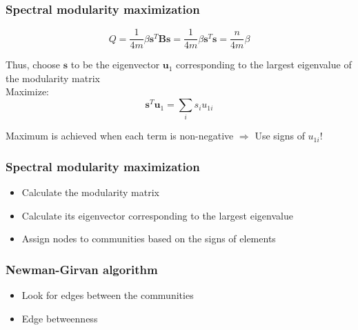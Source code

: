 \documentclass{beamer}
\begin{document}
\begin{frame}
    \frametitle{Spectral modularity maximization}
    \centering
$$Q = \frac{1}{4m}\beta{\mathbf s}^T{\mathbf B}{\mathbf s} = \frac{1}{4m}\beta {\mathbf s}^T{\mathbf s} = \frac{n}{4m}\beta$$

Thus, choose ${\mathbf s}$ to be the eigenvector ${\mathbf u_1}$ corresponding to the largest eigenvalue of the modularity matrix\\

Maximize:
$${\mathbf s}^T{\mathbf u}_1 = \sum\limits_is_iu_{1i}$$

Maximum is achieved when each term is non-negative $\Rightarrow$ Use signs of $u_{1i}$!

\end{frame}
\begin{frame}
    \frametitle{Spectral modularity maximization}
    \centering
    \begin{itemize}
    \setlength\itemsep{1em}
        \item{Calculate the modularity matrix}
        \item{Calculate its eigenvector corresponding to the largest eigenvalue}
        \item{Assign nodes to communities based on the signs of elements}
    \end{itemize}
\end{frame}
\begin{frame}
    \frametitle{Newman-Girvan algorithm}
    \centering
    
    \begin{itemize}
        \setlength\itemsep{1em}
        \item{Look for edges between the communities}

        \item{Edge betweenness}
    \end{itemize}
\end{frame}
\end{document}
